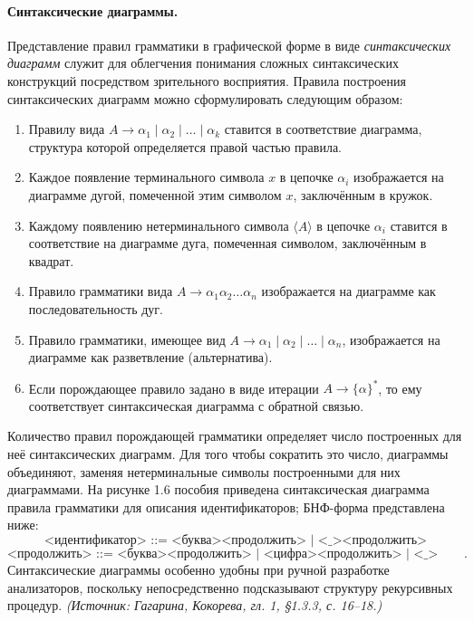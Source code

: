 \documentclass[a4paper,12pt]{article}
\begin{document}
\paragraph{Синтаксические диаграммы.}
Представление правил грамматики в графической форме в виде \emph{синтаксических диаграмм} служит для облегчения понимания сложных синтаксических конструкций посредством зрительного восприятия. Правила построения синтаксических диаграмм можно сформулировать следующим образом:
\begin{enumerate}[label=\arabic*)]
\item Правилу вида \(A\to\alpha_1\mid\alpha_2\mid\ldots\mid\alpha_k\) ставится в соответствие диаграмма, структура которой определяется правой частью правила.
\item Каждое появление терминального символа \(x\) в цепочке \(\alpha_i\) изображается на диаграмме дугой, помеченной этим символом \(x\), заключённым в кружок.
\item Каждому появлению нетерминального символа \(\langle A\rangle\) в цепочке \(\alpha_i\) ставится в соответствие на диаграмме дуга, помеченная символом, заключённым в квадрат.
\item Правило грамматики вида \(A\to\alpha_1\alpha_2\ldots\alpha_n\) изображается на диаграмме как последовательность дуг.
\item Правило грамматики, имеющее вид \(A\to\alpha_1\mid\alpha_2\mid\ldots\mid\alpha_n\), изображается на диаграмме как разветвление (альтернатива).
\item Если порождающее правило задано в виде итерации \(A\to\{\alpha\}^*\), то ему соответствует синтаксическая диаграмма с обратной связью.
\end{enumerate}
Количество правил порождающей грамматики определяет число построенных для неё синтаксических диаграмм. Для того чтобы сократить это число, диаграммы объединяют, заменяя нетерминальные символы построенными для них диаграммами. На рисунке 1.6 пособия приведена синтаксическая диаграмма правила грамматики для описания идентификаторов; БНФ-форма представлена ниже:
\[
\texttt{<идентификатор> ::= <буква><продолжить> | <\_><продолжить>}
\]
\[
\texttt{<продолжить> ::= <буква><продолжить> | <цифра><продолжить> | <\_><продолжить> | <пусто>}.
\]
Синтаксические диаграммы особенно удобны при ручной разработке анализаторов, поскольку непосредственно подсказывают структуру рекурсивных процедур.
\textit{(Источник: Гагарина, Кокорева, гл. 1, §1.3.3, с. 16--18.)}
\end{document}
